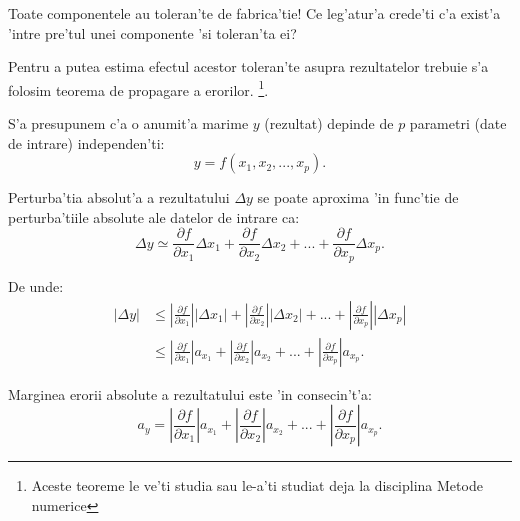 \begin{retine}
  \label{retine4}
  \index{}
    Toate componentele au toleran'te de fabrica'tie! Ce leg'atur'a crede'ti c'a exist'a 'intre pre'tul unei componente 'si toleran'ta ei?
\end{retine}

Pentru a putea estima efectul acestor toleran'te asupra rezultatelor trebuie s'a folosim teorema de propagare a erorilor. \footnote{Aceste teoreme le ve'ti studia sau le-a'ti studiat deja la disciplina Metode numerice}.

S'a presupunem c'a o anumit'a marime $y$ (rezultat) depinde de $p$ parametri (date de intrare) independen'ti:
\begin{equation*}
y = f(x_1, x_2, ..., x_p).
\end{equation*}

Perturba'tia absolut'a a rezultatului $\Delta y$ se poate aproxima 'in func'tie de perturba'tiile absolute ale datelor de intrare ca:
\begin{equation*} \label{eq:deltay}
\Delta y \simeq \frac{\partial f}{\partial x_1}\Delta x_1 + \frac{\partial f}{\partial x_2}\Delta x_2 + ... + \frac{\partial f}{\partial x_p}\Delta x_p.
\end{equation*}

De unde:
\begin{align*}
\left|\Delta y \right| 
&\leq 
\left|\frac{\partial f}{\partial x_1}\right|\left|\Delta x_1\right| + \left|\frac{\partial f}{\partial x_2}\right|\left|\Delta x_2\right| + ... + \left|\frac{\partial f}{\partial x_p}\right|\left|\Delta x_p\right| \\
&\leq 
\left|\frac{\partial f}{\partial x_1}\right| a_{x_1} + \left|\frac{\partial f}{\partial x_2}\right| a_{x_2} + ... + \left|\frac{\partial f}{\partial x_p}\right| a_{x_p}.
\end{align*}

Marginea erorii absolute a rezultatului este 'in consecin't'a:
\begin{equation} \label{eq:margine_err_abs}
a_y = \left|\frac{\partial f}{\partial x_1}\right| a_{x_1} + \left|\frac{\partial f}{\partial x_2}\right| a_{x_2} + ... + \left|\frac{\partial f}{\partial x_p}\right| a_{x_p}.
\end{equation}

